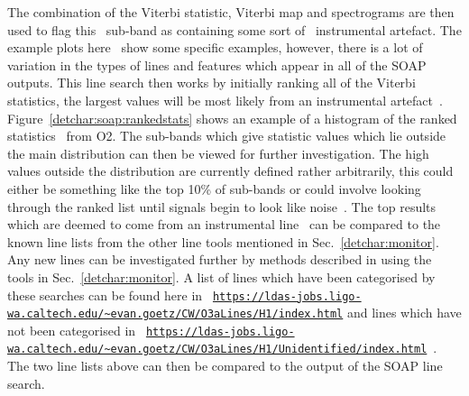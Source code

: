 The combination of the Viterbi statistic, Viterbi map and spectrograms are then
used to flag this~ sub-band as
containing some sort of~ instrumental
artefact.  The example plots here~ show some specific
examples, however, there is a lot of variation in the types of lines and
features which appear in all of the SOAP outputs.  This line search then works
by initially ranking all of the Viterbi statistics, the largest values will be
most likely from an instrumental artefact~. Figure~\ref{detchar:soap:rankedstats} shows an example of a
histogram of the ranked statistics~ from O2. The sub-bands which give statistic
values which lie outside the main distribution can then be viewed for further
investigation. The high values outside the distribution are currently defined
rather arbitrarily, this could either be something like the top 10\% of
sub-bands or could involve looking through the ranked list until signals begin
to look like noise~. The top results which are deemed to come from an
instrumental line~ can be compared to the known line lists from the other line
tools mentioned in Sec.~\ref{detchar:monitor}.  Any new lines can be
investigated further by methods described in
\citep{covas2018IdentificationMitigation} using the tools in
Sec.~\ref{detchar:monitor}.  A list of lines which have been categorised by
these searches can be found here in {\tt
\url{https://ldas-jobs.ligo-wa.caltech.edu/~evan.goetz/CW/O3aLines/H1/index.html}}
and lines which have not been categorised in {\tt
\url{https://ldas-jobs.ligo-wa.caltech.edu/~evan.goetz/CW/O3aLines/H1/Unidentified/index.html}}~.
The two line lists above can then be compared to the output of the SOAP line
search.~


